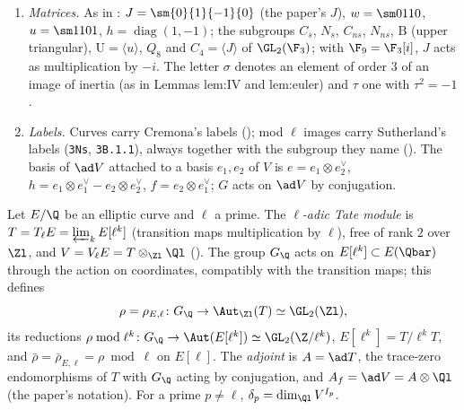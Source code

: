 \begin{convention}
\begin{enumerate}[label=(\alph*)]
$\varepsilon$ denotes an unramified character of $G_{\Q_q}$ of order at most $2$, and $\omega$, $\omega_2$ the fundamental characters of
. $E^{(d)}=E\otimes\chi_d$ is the quadratic twist, and $E^{(q)}=E^{(q^*)}$ for odd $q$.
\item \emph{Matrices.} As in : $J=\sm{0}{1}{-1}{0}$ (the paper's $J$), $w=\sm0110$, $u=\sm1101$, $h=\operatorname{diag}(1,-1)$; the
subgroups $C_s$, $N_s$, $C_{ns}$, $N_{ns}$, $\mathrm B$ (upper triangular), $\mathrm U=\langle u\rangle$, $Q_8$ and $C_4=\langle J\rangle$ of $\GL_2(\F_3)$; with
$\F_9=\F_3[i]$, $J$ acts as multiplication by $-i$. The letter $\sigma$ denotes an element of order $3$ of an image of inertia (as in Lemmas
lem:IV and lem:euler) and $\tau$ one with $\tau^2=-1$.
\item \emph{Labels.} Curves carry Cremona's labels (); mod $\ell$ images carry Sutherland's labels (\texttt{3Ns},
\texttt{3B.1.1}), always together with the subgroup they name (). The basis of $\ad V$ attached to a basis
$e_1,e_2$ of $V$ is $e=e_1\otimes e_2^\vee$, $h=e_1\otimes e_1^\vee-e_2\otimes e_2^\vee$, $f=e_2\otimes e_1^\vee$; $G$ acts on $\ad V$ by conjugation.
\end{enumerate}
\end{convention}

\begin{definition}\label{def:galrep:rho}
Let $E/\Q$ be an elliptic curve and $\ell$ a prime. The \emph{$\ell$-adic Tate module} is $T=T_\ell E=\varprojlim_kE[\ell^k]$ (transition maps
multiplication by $\ell$), free of rank $2$ over $\Zl$, and $V=V_\ell E=T\otimes_{\Zl}\Ql$ (). The group $G_\Q$ acts on
$E[\ell^k]\subset E(\Qbar)$ through the action on coordinates, compatibly with the transition maps; this defines
\[
\rho=\rho_{E,\ell}\colon G_\Q\to\Aut_{\Zl}(T)\simeq\GL_2(\Zl),
\]
its reductions $\rho\bmod\ell^k\colon G_\Q\to\Aut(E[\ell^k])\simeq\GL_2(\Z/\ell^k)$, $E[\ell^k]=T/\ell^kT$, and $\bar\rho=\bar\rho_{E,\ell}=\rho\bmod\ell$ on $E[\ell]$.
The \emph{adjoint} is $A=\ad T$, the trace-zero endomorphisms of $T$ with $G_\Q$ acting by conjugation, and $A_f=\ad V=A\otimes\Ql$ (the
paper's notation). For a prime $p\ne\ell$, $\delta_p=\dim_{\Ql}V^{I_p}$.
\end{definition}

